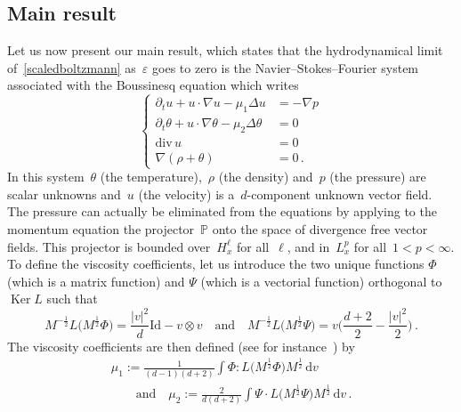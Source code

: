 \documentclass[11pt]{article}
\theoremstyle{definition}
\numberwithin{equation}{section}
\numberwithin{figure}{section}
\numberwithin{table}{section}
\newcommand*{\dd}{\mathrm{d}}
\newcommand*{\dv}{\dd v}
\newcommand*\e{{\varepsilon}}
\begin{document}
\subsection{Main result}
Let us now present our main result, which states that the hydrodynamical limit of~\eqref{scaledboltzmann} as~$\e$ goes to zero is the Navier--Stokes--Fourier system associated with the Boussinesq equation which writes
\begin{equation}\label{NSF}
\begin{cases}
\partial_t u + u \cdot \nabla u- \mu_1 \Delta u\!\!\!\! &= - \nabla p \\
\partial_t \theta + u \cdot \nabla \theta- \mu_2 \Delta \theta\!\!\!\! &= 0 \\
\text{div}\, u & = 0 \\
\nabla(\rho+\theta) &= 0 \,.
\end{cases}
\end{equation}
In this system~$\theta$ (the temperature),~$\rho$ (the density) and~$p$ (the pressure) are scalar unknowns and~$u$ (the velocity) is a~$d$-component unknown vector field. The pressure can actually be eliminated from the equations by applying to the momentum equation the projector~${\mathbb P}$ onto the space of divergence free vector fields. This projector is bounded over~$H^\ell_x$ for all~$\ell$, and in~$L^p_x$ for all~$1<p<\infty$. To define the viscosity coefficients, let us introduce the two unique functions $\Phi$ (which is a matrix function) and $\Psi$ (which is a vectorial function) orthogonal to~$\operatorname{Ker} L$ such that
\[
M^{-\frac12}L\big(M^{\frac12} \Phi\big) = \frac{|v|^2}{d } {\text{Id}} -v\otimes v
\quad \text{and} \quad M^{-\frac12}L\big(M^{\frac12} \Psi\big) =v\bigg(\frac{d+2}{2}-\frac{|v|^2}{2}\bigg) \,.
\]
The viscosity coefficients are then defined (see for instance~\cite{bgl1}) by
\begin{multline*}
\mu_1 :=\frac{1}{(d-1)(d+2)}\int\Phi : L\big(M^{\frac12}\Phi\big) M^{\frac12} \, \dv \\\qquad \text{and} \quad
\mu_2 :=\frac{2}{d(d+2)} \int \Psi \cdot L\big(M^{\frac12}\Psi\big) M^{\frac12} \, \dv \,.
\end{multline*}
\end{document}
